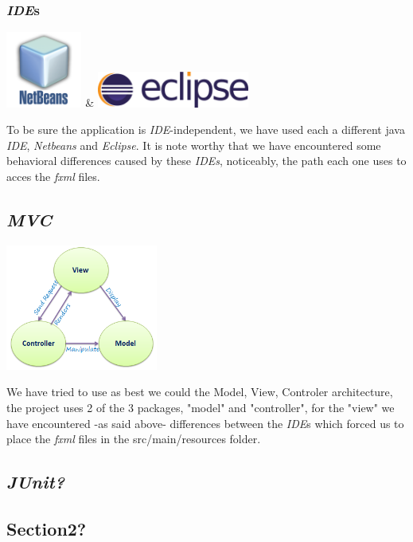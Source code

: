 \documentclass[11pt]{article}
\begin{document}
\subsubsection{\textit{IDE}s}
\begin{center}
\includegraphics[width=2.5cm]{./img/netBeans.png} \& \includegraphics[width=5cm]{./img/eclipse.png}
\end{center}
To be sure the application is \textit{IDE}-independent, we have used each a different java \textit{IDE}, \textit{Netbeans} and \textit{Eclipse}. It is note worthy that we have encountered some behavioral differences caused by these \textit{IDEs}, noticeably, the path each one uses to acces the \textit{fxml} files.
\subsection{\textit{MVC}}
\begin{center}
\includegraphics[width=5cm]{./img/mvc.png}
\end{center}
We have tried to use as best we could the Model, View, Controler architecture, the project uses 2 of the 3 packages, "model" and "controller", for the "view" we have encountered -as said above- differences between the \textit{IDE}s which forced us to place the \textit{fxml} files in the src/main/resources folder.
\subsection{\textit{JUnit?}}
\subsection{Section2?}
\pagebreak
\end{document}
